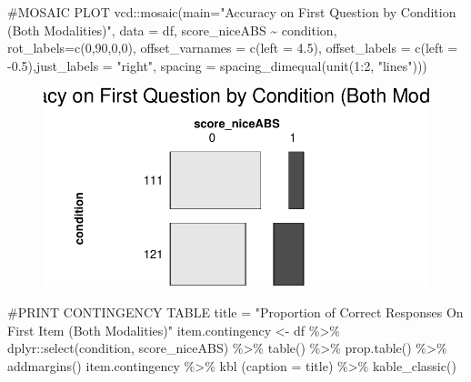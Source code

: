 \documentclass[
  letterpaper,
  DIV=11,
  numbers=noendperiod]{scrreprt}
\newenvironment{Shaded}{\begin{snugshade}}{\end{snugshade}}
\newcommand{\AttributeTok}[1]{\textcolor[rgb]{0.40,0.45,0.13}{#1}}
\newcommand{\CommentTok}[1]{\textcolor[rgb]{0.37,0.37,0.37}{#1}}
\newcommand{\DecValTok}[1]{\textcolor[rgb]{0.68,0.00,0.00}{#1}}
\newcommand{\FloatTok}[1]{\textcolor[rgb]{0.68,0.00,0.00}{#1}}
\newcommand{\FunctionTok}[1]{\textcolor[rgb]{0.28,0.35,0.67}{#1}}
\newcommand{\NormalTok}[1]{\textcolor[rgb]{0.00,0.23,0.31}{#1}}
\newcommand{\OtherTok}[1]{\textcolor[rgb]{0.00,0.23,0.31}{#1}}
\newcommand{\SpecialCharTok}[1]{\textcolor[rgb]{0.37,0.37,0.37}{#1}}
\newcommand{\StringTok}[1]{\textcolor[rgb]{0.13,0.47,0.30}{#1}}
\begin{document}
\begin{Shaded}
\begin{Highlighting}[]
\CommentTok{\#MOSAIC PLOT}
\NormalTok{vcd}\SpecialCharTok{::}\FunctionTok{mosaic}\NormalTok{(}\AttributeTok{main=}\StringTok{"Accuracy on First Question by Condition (Both Modalities)"}\NormalTok{,}
            \AttributeTok{data =}\NormalTok{ df, score\_niceABS }\SpecialCharTok{\textasciitilde{}}\NormalTok{ condition, }\AttributeTok{rot\_labels=}\FunctionTok{c}\NormalTok{(}\DecValTok{0}\NormalTok{,}\DecValTok{90}\NormalTok{,}\DecValTok{0}\NormalTok{,}\DecValTok{0}\NormalTok{),}
            \AttributeTok{offset\_varnames =} \FunctionTok{c}\NormalTok{(}\AttributeTok{left =} \FloatTok{4.5}\NormalTok{), }\AttributeTok{offset\_labels =} \FunctionTok{c}\NormalTok{(}\AttributeTok{left =} \SpecialCharTok{{-}}\FloatTok{0.5}\NormalTok{),}\AttributeTok{just\_labels =} \StringTok{"right"}\NormalTok{,}
            \AttributeTok{spacing =} \FunctionTok{spacing\_dimequal}\NormalTok{(}\FunctionTok{unit}\NormalTok{(}\DecValTok{1}\SpecialCharTok{:}\DecValTok{2}\NormalTok{, }\StringTok{"lines"}\NormalTok{)))}
\end{Highlighting}
\end{Shaded}

\begin{figure}[H]

{\centering \includegraphics{analysis/SGC3A/5_sgc3A_exploration_files/figure-pdf/VIS-LR-Q1.tri.by.Cond-2.pdf}

}

\end{figure}

\begin{Shaded}
\begin{Highlighting}[]
\CommentTok{\#PRINT CONTINGENCY TABLE}
\NormalTok{title }\OtherTok{=} \StringTok{"Proportion of Correct Responses On First Item (Both Modalities)"}
\NormalTok{item.contingency }\OtherTok{\textless{}{-}}\NormalTok{  df }\SpecialCharTok{\%\textgreater{}\%}\NormalTok{ dplyr}\SpecialCharTok{::}\FunctionTok{select}\NormalTok{(condition, score\_niceABS) }\SpecialCharTok{\%\textgreater{}\%} \FunctionTok{table}\NormalTok{() }\SpecialCharTok{\%\textgreater{}\%} \FunctionTok{prop.table}\NormalTok{() }\SpecialCharTok{\%\textgreater{}\%} \FunctionTok{addmargins}\NormalTok{()}
\NormalTok{item.contingency }\SpecialCharTok{\%\textgreater{}\%} \FunctionTok{kbl}\NormalTok{ (}\AttributeTok{caption =}\NormalTok{ title) }\SpecialCharTok{\%\textgreater{}\%} \FunctionTok{kable\_classic}\NormalTok{()}
\end{Highlighting}
\end{Shaded}
\end{document}
